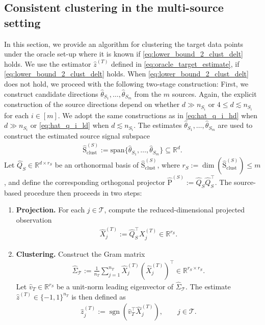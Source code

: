 \documentclass[10pt]{article}
\newcommand{\R}{\mathbb R}
\newcommand{\sgn}{\operatorname{sgn}}
\newcommand{\wh}{\widehat}
\renewcommand{\sp}{\mathrm{span}}
\newcommand{\calT}{\mathcal T}
\newcommand{\trg}{T}
\newcommand{\nT}{n_{\trg}}
\newcommand{\Xtar}{X^{(\trg)}}
\newcommand{\hatztar}{\wh{z}^{(\trg)}}
\newcommand{\hatXtar}{\wh{X}^{(\trg)}}
\newcommand{\src}{S}
\newcommand{\nSm}[1]{n_{\src_{#1}}}
\newcommand{\hatthetaSm}[1]{\wh{\theta}_{S_{#1}}}
\newcommand{\Pest}{\wh{\mathrm P}}
\newcommand{\spclust}{\wh{\mathrm{S}}_{\mathrm{clust}}}
\begin{document}
\subsection{Consistent clustering in the multi-source setting}
In this section, we provide an algorithm for clustering the target data points under the oracle set-up where it is known if \eqref{eq:lower_bound_2_clust_delt} holds. We use the estimator $\hatztar$ defined in \eqref{eq:oracle_target_estimate}, if \eqref{eq:lower_bound_2_clust_delt} holds. When \eqref{eq:lower_bound_2_clust_delt} does not hold, we proceed with the following two-stage construction: First, we construct candidate directions $\hatthetaSm{1},\ldots,\hatthetaSm{m}$ from the $m$ sources. Again, the explicit construction of the source directions depend on whether $d \gg \nSm{i}$ or $4 \le d \lesssim \nSm{i}$ for each $i \in [m]$. We adopt the same constructions as in \eqref{eq:hat_q_i_hd} when $d \gg \nSm{i}$ or \eqref{eq:hat_q_i_ld} when $d \lesssim \nSm{i}$. The estimates $\hatthetaSm{1},\ldots,\hatthetaSm{m}$ are used to construct the estimated source signal subspace 
\begin{align}
\label{eq:combined_source_space}
\spclust^{(\src)}:=\sp\{\hatthetaSm{1},\ldots,\hatthetaSm{m}\}\subseteq \R^d.
\end{align}
Let $\widehat Q_{\src}\in\R^{d\times r_{\src}}$ be an orthonormal basis of
$\spclust^{(\src)}$, where
$r_{\src}:=\dim(\spclust^{(\src)})\le m$, and define the corresponding orthogonal projector $\Pest^{(\src)}:=\widehat Q_{\src}\widehat Q_{\src}^{\top}.$
The source-based procedure then proceeds in two steps:
\begin{enumerate}
    \item \textbf{Projection.}
    For each $j\in\calT$, compute the reduced-dimensional projected observation
    \begin{align}
    \label{eq:def_hat_x_tar_q_tar}
        \hatXtar_j:=\widehat Q_{\src}^{\top}\Xtar_j\in\R^{r_{\src}}.
    \end{align}
    \item \textbf{Clustering.}
    Construct the Gram matrix
    \begin{align}
    \label{eq:hat_sigma_t}
        \wh{\Sigma}_{\calT}:=\frac{1}{\nT}\sum_{j=1}^{\nT}\hatXtar_j(\hatXtar_j)^\top\in\R^{r_{\src}\times r_{\src}}.
    \end{align}
    Let $\wh v_{\trg}\in\R^{r_{\src}}$ be a unit-norm leading eigenvector of
    $\wh{\Sigma}_{\calT}$. The estimate $\hatztar \in \{-1,1\}^{\nT}$ is then defined as
    \begin{align}
    \label{eq:oracle_source_estimate_mult_source}
        \hatztar_j:=\sgn\left(\wh v_{\trg}^{\top}\hatXtar_j \right),\qquad j\in\calT.
    \end{align}
\end{enumerate}
\end{document}
